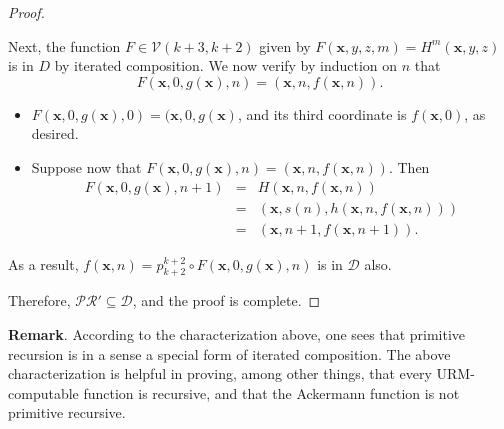 \documentclass[12pt]{article}
\begin{document}
\begin{proof}
\begin{enumerate}
Next, the function $F\in\mathcal{V}(k+3,k+2)$ given by $F(\boldsymbol{x},y,z,m)=H^m(\boldsymbol{x},y,z)$ is in $D$ by iterated composition.  We now verify by induction on $n$ that $$F(\boldsymbol{x},0,g(\boldsymbol{x}),n)=(\boldsymbol{x},n,f(\boldsymbol{x},n)).$$
\begin{itemize}
\item $F(\boldsymbol{x},0,g(\boldsymbol{x}),0)=(\boldsymbol{x},0,g(\boldsymbol{x})$, and its third coordinate is $f(\boldsymbol{x},0)$, as desired.
\item Suppose now that $F(\boldsymbol{x},0,g(\boldsymbol{x}),n)=(\boldsymbol{x},n,f(\boldsymbol{x},n))$.  Then 
\begin{eqnarray*}
F(\boldsymbol{x},0,g(\boldsymbol{x}),n+1) &=& H(\boldsymbol{x},n,f(\boldsymbol{x},n)) \\ &=& (\boldsymbol{x},s(n),h(\boldsymbol{x},n,f(\boldsymbol{x},n))) \\ &=& (\boldsymbol{x},n+1,f(\boldsymbol{x},n+1)).
\end{eqnarray*}
\end{itemize}
As a result, $f(\boldsymbol{x},n)=p_{k+2}^{k+2}\circ F(\boldsymbol{x},0,g(\boldsymbol{x}),n)$ is in $\mathcal{D}$ also.
\end{enumerate} 
Therefore, $\mathcal{PR}'\subseteq \mathcal{D}$, and the proof is complete.
\end{proof}

\textbf{Remark}.  According to the characterization above, one sees that primitive recursion is in a sense a special form of iterated composition.  The above characterization is helpful in proving, among other things, that every URM-computable function is recursive, and that the Ackermann function is not primitive recursive.
\end{document}
